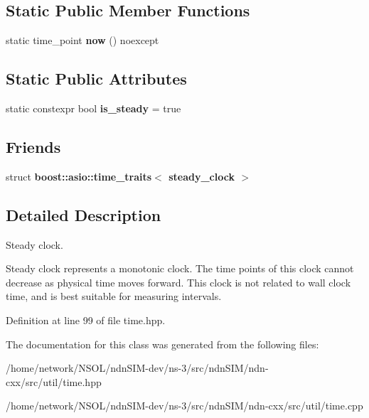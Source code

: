 \subsection*{Static Public Member Functions}
\begin{DoxyCompactItemize}
\item 
static time\+\_\+point {\bfseries now} () noexcept\hypertarget{classndn_1_1time_1_1steady__clock_a19a2423d2bfe11dbc74e3efe7e3da16e}{}\label{classndn_1_1time_1_1steady__clock_a19a2423d2bfe11dbc74e3efe7e3da16e}

\end{DoxyCompactItemize}
\subsection*{Static Public Attributes}
\begin{DoxyCompactItemize}
\item 
static constexpr bool {\bfseries is\+\_\+steady} = true\hypertarget{classndn_1_1time_1_1steady__clock_a6a9752271b82d4d95610d559c79e3039}{}\label{classndn_1_1time_1_1steady__clock_a6a9752271b82d4d95610d559c79e3039}

\end{DoxyCompactItemize}
\subsection*{Friends}
\begin{DoxyCompactItemize}
\item 
struct {\bfseries boost\+::asio\+::time\+\_\+traits$<$ steady\+\_\+clock $>$}\hypertarget{classndn_1_1time_1_1steady__clock_aa7915600b2d19b90f0f3a13ff11e3566}{}\label{classndn_1_1time_1_1steady__clock_aa7915600b2d19b90f0f3a13ff11e3566}

\end{DoxyCompactItemize}


\subsection{Detailed Description}
Steady clock. 

Steady clock represents a monotonic clock. The time points of this clock cannot decrease as physical time moves forward. This clock is not related to wall clock time, and is best suitable for measuring intervals. 

Definition at line 99 of file time.\+hpp.



The documentation for this class was generated from the following files\+:\begin{DoxyCompactItemize}
\item 
/home/network/\+N\+S\+O\+L/ndn\+S\+I\+M-\/dev/ns-\/3/src/ndn\+S\+I\+M/ndn-\/cxx/src/util/time.\+hpp\item 
/home/network/\+N\+S\+O\+L/ndn\+S\+I\+M-\/dev/ns-\/3/src/ndn\+S\+I\+M/ndn-\/cxx/src/util/time.\+cpp\end{DoxyCompactItemize}
